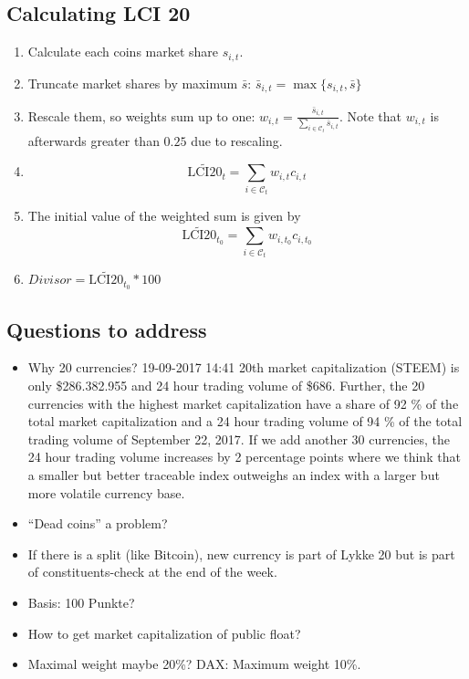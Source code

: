 \documentclass[11pt]{article}
\begin{document}
\subsection{Calculating LCI 20}

\begin{enumerate}
  \item Calculate each coins market share $s_{i,t}$.
  \item Truncate market shares by maximum $\bar s$: $\bar s_{i,t} = \max\{ s_{i,t}, \bar s\}$
  \item Rescale them, so weights sum up to one: $w_{i,t} = \frac{\bar s_{i,t}}{\sum_{i \in \mathcal{C}_t} \bar s_{i,t}}$. Note that $w_{i,t}$ is afterwards greater than $0.25$ due to rescaling.
  \item $$\widetilde{\text{LCI20}}_t = \sum_{i \in \mathcal{C}_{t}} w_{i,t} c_{i,t}$$
  \item The initial value of the weighted sum is given by $$\widetilde{\text{LCI20}}_{t_0} = \sum_{i \in \mathcal{C}_{t}} w_{i,t_0} c_{i,t_0}$$
  \item $Divisor = \widetilde{\text{LCI20}}_{t_0} * 100$
\end{enumerate}

\subsection{Questions to address}
\begin{itemize}
  \item Why 20 currencies? 19-09-2017 14:41 20th market capitalization (STEEM) is only \$286.382.955 and 24 hour trading volume of \$686. Further, the 20 currencies with the highest market capitalization have a share of 92 \% of the total market capitalization and a 24 hour trading volume of 94 \% of the total trading volume of September 22, 2017. If we add another 30 currencies, the 24 hour trading volume increases by 2 percentage points where we think that a smaller but better traceable index outweighs an index with a larger but more volatile currency base.
  \item ``Dead coins'' a problem?
  \item If there is a split (like Bitcoin), new currency is part of Lykke 20 but is part of constituents-check at the end of the week.
  \item Basis: 100 Punkte?
  \item How to get market capitalization of public float?
  \item Maximal weight maybe 20\%? DAX: Maximum weight 10\%.
\end{itemize}
\end{document}
